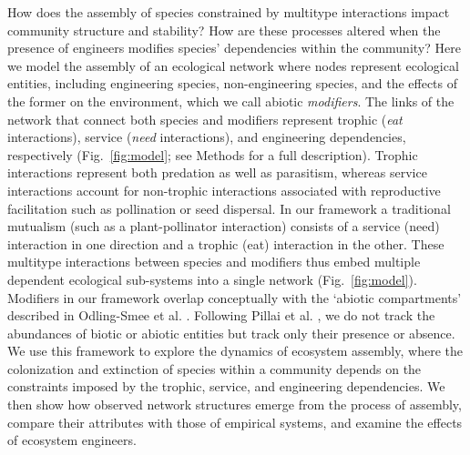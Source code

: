 \documentclass[twocolumn,preprintnumbers,amsmath,amssymb,superscriptaddress,linenumbers]{revtex4-1}
\begin{document}
\begin{bibunit}
How does the assembly of species constrained by multitype interactions impact community structure and stability?
How are these processes altered when the presence of engineers modifies species' dependencies within the community?
Here we model the assembly of an ecological network where nodes represent ecological entities, including engineering species, non-engineering species, and the effects of the former on the environment, which we call abiotic \emph{modifiers}.
The links of the network that connect both species and modifiers represent trophic (\emph{eat} interactions), service (\emph{need} interactions), and engineering dependencies, respectively (Fig.\ \ref{fig:model}; see Methods for a full description).
Trophic interactions represent both predation as well as parasitism, whereas service interactions account for non-trophic interactions associated with reproductive facilitation such as pollination or seed dispersal.
In our framework a traditional mutualism (such as a plant-pollinator interaction) consists of a service (need) interaction in one direction and a trophic (eat) interaction in the other.
These multitype interactions between species and modifiers thus embed multiple dependent ecological sub-systems into a single network (Fig.\ \ref{fig:model}). %
Modifiers in our framework overlap conceptually with the `abiotic compartments' described in Odling-Smee et al. \cite{OdlingSmee2013}.
Following Pillai et al. \cite{Pillai2011}, we do not track the abundances of biotic or abiotic entities but track only their presence or absence.
We use this framework to explore the dynamics of ecosystem assembly, where the colonization and extinction of species within a community depends on the constraints imposed by the trophic, service, and engineering dependencies.
We then show how observed network structures emerge from the process of assembly, compare their attributes with those of empirical systems, and examine the effects of ecosystem engineers.


\end{bibunit}
\end{document}
